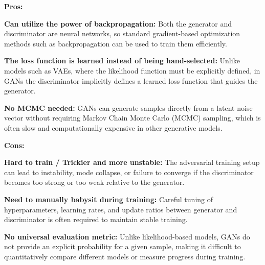 \textbf{Pros:}  
\begin{compactitemize}
    \item \textbf{Can utilize the power of backpropagation:} Both the generator and discriminator are neural networks, so standard gradient-based optimization methods such as backpropagation can be used to train them efficiently.  
    \item \textbf{The loss function is learned instead of being hand-selected:} Unlike models such as VAEs, where the likelihood function must be explicitly defined, in GANs the discriminator implicitly defines a learned loss function that guides the generator.  
    \item \textbf{No MCMC needed:} GANs can generate samples directly from a latent noise vector without requiring Markov Chain Monte Carlo (MCMC) sampling, which is often slow and computationally expensive in other generative models.
\end{compactitemize}

\textbf{Cons:}  
\begin{compactitemize}
    \item \textbf{Hard to train / Trickier and more unstable:} The adversarial training setup can lead to instability, mode collapse, or failure to converge if the discriminator becomes too strong or too weak relative to the generator.  
    \item \textbf{Need to manually babysit during training:} Careful tuning of hyperparameters, learning rates, and update ratios between generator and discriminator is often required to maintain stable training.  
    \item \textbf{No universal evaluation metric:} Unlike likelihood-based models, GANs do not provide an explicit probability for a given sample, making it difficult to quantitatively compare different models or measure progress during training.  
\end{compactitemize}